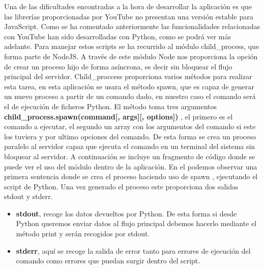Una de las dificultades encontradas a la hora de desarrollar la aplicación es que las librerías proporcionadas por YouTube no presentan una versión estable para JavaScript. Como se ha comentado anteriormente las funcionalidades relacionadas con YouTube han sido desarrolladas con Python, como se podrá ver más adelante. 
Para manejar estos scripts se ha recurrido al módulo child\_process, que forma parte de NodeJS. A través de este módulo Node nos proporciona la opción de crear un proceso hijo de forma asíncrona, es decir sin bloquear el flujo principal del servidor. Child\_proccess proporciona varios métodos para realizar esta tarea, en esta aplicación se usara el método spawn, que es capaz de generar un nuevo proceso a partir de un comando dado, en nuestro caso el comando será el de ejecución de ficheros Python.
El método toma tres argumentos \textbf{child\_process.spawn(command[, args][, options])} , el primero es el comando a ejecutar, el segundo un array con los argumentos del comando si este los tuviera y por ultimo opciones del comando. De esta forma se crea un proceso paralelo al servidor capaz que ejecuta el comando en un terminal del sistema sin bloquear al servidor.
A continuación se incluye un fragmento de código donde se puede ver el uso del módulo dentro de la aplicación. En el podemos observar una primera sentencia donde se crea el proceso haciendo uso de spawn , ejecutando el script de Python. Una vez generado el proceso este proporciona dos salidas stdout y stderr.

\begin{itemize}
    \item \textbf{stdout}, recoge los datos devueltos por Python. De esta forma si desde Python queremos enviar datos al flujo principal debemos hacerlo mediante el método print y serán recogidos por stdout.
    \item \textbf{stderr}, aquí se recoge la salida de error tanto para errores de ejecución del comando como errores que puedan surgir dentro del script.
\end{itemize}

